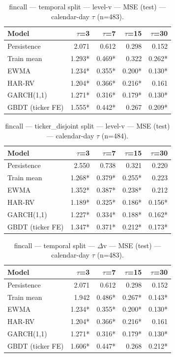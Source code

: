 \begin{table}[t]
\centering
\begin{tabular}{lrrrr}
\toprule
Model & $\tau$=3 & $\tau$=7 & $\tau$=15 & $\tau$=30 \\
\midrule
Persistence & 2.071 & 0.612 & 0.298 & 0.152 \\
Train mean & 1.293* & 0.469* & 0.322 & 0.262* \\
EWMA & 1.234* & 0.355* & 0.200* & 0.130* \\
HAR-RV & 1.204* & 0.366* & 0.216* & 0.161 \\
GARCH(1,1) & 1.271* & 0.316* & 0.179* & 0.130* \\
GBDT (ticker FE) & 1.555* & 0.442* & 0.267 & 0.209* \\
\bottomrule
\end{tabular}
\caption{fincall — temporal split — level-v — MSE (test) — calendar-day $\tau$ (n=483).}
\end{table}

\begin{table}[t]
\centering
\begin{tabular}{lrrrr}
\toprule
Model & $\tau$=3 & $\tau$=7 & $\tau$=15 & $\tau$=30 \\
\midrule
Persistence & 2.550 & 0.738 & 0.321 & 0.220 \\
Train mean & 1.268* & 0.379* & 0.255* & 0.223 \\
EWMA & 1.352* & 0.387* & 0.238* & 0.212 \\
HAR-RV & 1.189* & 0.325* & 0.186* & 0.156* \\
GARCH(1,1) & 1.227* & 0.334* & 0.188* & 0.162* \\
GBDT (ticker FE) & 1.347* & 0.371* & 0.212* & 0.173* \\
\bottomrule
\end{tabular}
\caption{fincall — ticker\_disjoint split — level-v — MSE (test) — calendar-day $\tau$ (n=484).}
\end{table}

\begin{table}[t]
\centering
\begin{tabular}{lrrrr}
\toprule
Model & $\tau$=3 & $\tau$=7 & $\tau$=15 & $\tau$=30 \\
\midrule
Persistence & 2.071 & 0.612 & 0.298 & 0.152 \\
Train mean & 1.942 & 0.486* & 0.267* & 0.143* \\
EWMA & 1.234* & 0.355* & 0.200* & 0.130* \\
HAR-RV & 1.204* & 0.366* & 0.216* & 0.161 \\
GARCH(1,1) & 1.271* & 0.316* & 0.179* & 0.130* \\
GBDT (ticker FE) & 1.606* & 0.447* & 0.268 & 0.212* \\
\bottomrule
\end{tabular}
\caption{fincall — temporal split — $\Delta$v — MSE (test) — calendar-day $\tau$ (n=483).}
\end{table}


